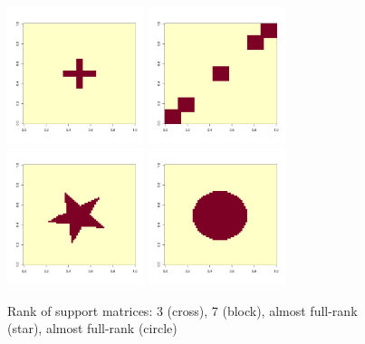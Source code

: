 \documentclass[11pt]{article}
\theoremstyle{definition}
\begin{document}
\begin{figure}[ht]
    \centering
    \includegraphics[width=4cm]{cross.pdf}
      \includegraphics[width=4cm]{block.pdf}
        \includegraphics[width=4cm]{star.pdf}
          \includegraphics[width=4cm]{circle.pdf}
            
          \caption{Rank of support matrices: 3 (cross), 7 (block), almost full-rank (star), almost full-rank (circle)}\label{fig:region}
\end{figure}
\end{document}
